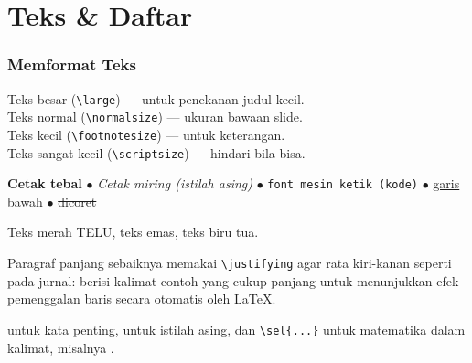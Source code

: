 \section{Teks \& Daftar}

\begin{frame}
  \frametitle{Memformat Teks}

  {\large Teks besar (\texttt{\textbackslash large})} --- untuk penekanan judul kecil.\\
  Teks normal (\texttt{\textbackslash normalsize}) --- ukuran bawaan slide.\\
  {\footnotesize Teks kecil (\texttt{\textbackslash footnotesize}) --- untuk keterangan.}\\
  {\scriptsize Teks sangat kecil (\texttt{\textbackslash scriptsize}) --- hindari bila bisa.}

  \medskip
  \textbf{Cetak tebal} $\bullet$
  \emph{Cetak miring (istilah asing)} $\bullet$
  \texttt{font mesin ketik (kode)} $\bullet$
  \underline{garis bawah} $\bullet$
  \sout{dicoret} %

  \medskip
  \textcolor{telu}{Teks merah TELU}, \textcolor{emas}{teks emas},
  \textcolor{biruTua}{teks biru tua}.

  \medskip
  \begin{justify}
    Paragraf panjang sebaiknya memakai \texttt{\textbackslash justifying} agar
    rata kiri-kanan seperti pada jurnal: berisi kalimat contoh yang cukup panjang
    untuk menunjukkan efek pemenggalan baris secara otomatis oleh LaTeX.
  \end{justify}

  \medskip
   untuk kata penting,
   untuk istilah asing, dan
  \texttt{\textbackslash sel\{...\}} untuk matematika dalam kalimat, misalnya
  .
\end{frame}

